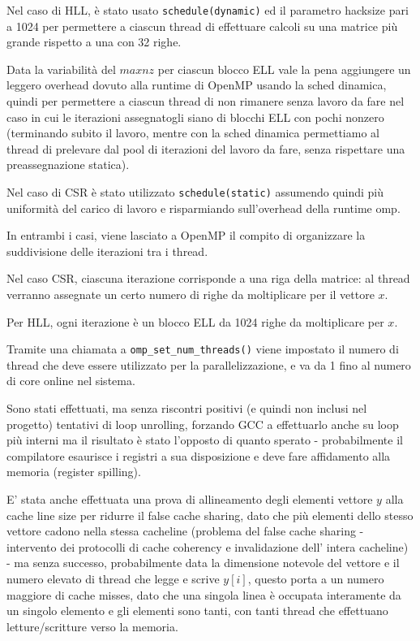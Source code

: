 \documentclass[9pt]{extarticle}
\begin{document}
Nel caso di HLL, è stato usato \texttt{schedule(dynamic)} ed il parametro hacksize pari a 1024 per permettere a ciascun
thread di effettuare calcoli su una matrice più grande rispetto a una con 32 righe. 

Data la variabilità del $maxnz$ per
ciascun blocco ELL vale la pena aggiungere un leggero overhead dovuto alla runtime di OpenMP usando la sched dinamica,
quindi per permettere a ciascun thread di non rimanere senza lavoro da fare nel caso in cui le iterazioni assegnatogli
siano di blocchi ELL con pochi nonzero (terminando subito il lavoro, mentre con la sched dinamica permettiamo al thread di
prelevare dal pool di iterazioni del lavoro da fare, senza rispettare una preassegnazione statica).

Nel caso di CSR è stato utilizzato \texttt{schedule(static)} assumendo quindi più uniformità del carico di lavoro
e risparmiando sull'overhead della runtime omp.

In entrambi i casi, viene lasciato a OpenMP il compito di organizzare la suddivisione delle iterazioni tra i thread.

Nel caso CSR, ciascuna iterazione corrisponde a una riga della matrice: al thread verranno assegnate un certo
numero di righe da moltiplicare per il vettore $x$.

Per HLL, ogni iterazione è un blocco ELL da 1024 righe da moltiplicare per $x$.

Tramite una chiamata a \texttt{omp\_set\_num\_threads()} viene impostato il numero di thread che deve essere utilizzato
per la parallelizzazione, e va da 1 fino al numero di core online nel sistema.

Sono stati effettuati, ma senza riscontri positivi (e quindi non inclusi nel progetto) tentativi di loop unrolling,
forzando GCC a effettuarlo anche su loop più interni ma il risultato è stato l'opposto di quanto sperato - probabilmente
il compilatore esaurisce i registri a sua disposizione e deve fare affidamento alla memoria (register spilling).

E' stata anche effettuata una prova di allineamento degli elementi vettore $y$ alla cache line size per ridurre il
false cache sharing, dato che più elementi dello stesso vettore
cadono nella stessa cacheline (problema del false
cache sharing - intervento dei protocolli di cache coherency e invalidazione dell' intera cacheline) - ma senza successo, probabilmente data la dimensione
notevole del vettore e il numero elevato di thread che legge e scrive $y[i]$, questo porta a un numero maggiore di cache 
misses, dato che una singola linea è occupata interamente da un singolo elemento e gli elementi sono tanti, con tanti
thread che effettuano letture/scritture verso la memoria.
\end{document}
